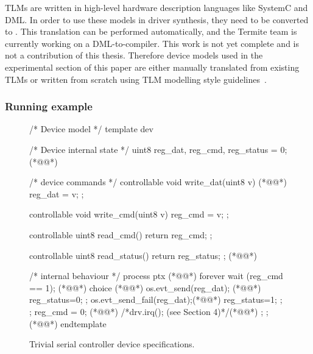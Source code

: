 TLMs are written in high-level hardware description languages like SystemC and DML\@.  In order to use these models in driver synthesis, they need to be converted to \tsl.  This translation can be performed automatically, and the Termite team is currently working on a DML-to-\tsl compiler. This work is not yet complete and is not a contribution of this thesis. Therefore device models used in the experimental section of this paper are either manually translated from existing TLMs or written from scratch using TLM modelling style guidelines~\cite{dml_ug}.

\subsubsection{Running example}

\begin{figure}
\begin{tsllisting}[name=ex]
/* Device model */
template dev 

    /* Device internal state */
    uint8 reg_dat, reg_cmd, reg_status = 0; (*@\label{f:ex_dev:l:reg_decls}@*)

    /* device commands */
    controllable void write_dat(uint8 v) { (*@\label{f:ex_dev:l:start_access}@*)
        reg_dat = v; 
    };

    controllable void write_cmd(uint8 v) { 
        reg_cmd = v; 
    };

    controllable uint8 read_cmd() { 
        return reg_cmd; 
    };

    controllable uint8 read_status() { 
        return reg_status; 
    }; (*@\label{f:ex_dev:l:end_access}@*)

    /* internal behaviour */
    process ptx { (*@\label{f:ex_dev:l:start_xmit}@*)
        forever {
            wait (reg_cmd == 1); (*@\label{f:ex_dev:l:wait}@*)
            choice {(*@\label{f:ex_dev:l:atomic_start}@*)
                { 
                    os.evt_send(reg_dat); (*@\label{f:ex_dev:l:cb_succ}@*)
                    reg_status=0; 
                };
                { 
                    os.evt_send_fail(reg_dat);(*@\label{f:ex_dev:l:cb_fail}@*)
                    reg_status=1; 
                };
            };
            reg_cmd = 0; (*@\label{f:ex_dev:l:atomic_end}@*)
            /*drv.irq(); (see Section 4)*/(*@\label{f:ex_dev:l:irq}@*)
        };
    }; (*@\label{f:ex_dev:l:end_xmit}@*)
endtemplate
\end{tsllisting}
\caption{Trivial serial controller device specifications.}
\label{f:ex_dev}
\end{figure}

